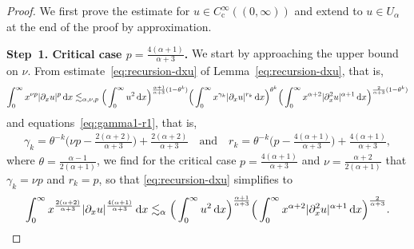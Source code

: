 \documentclass[reqno,12pt]{amsart}
\renewcommand{\d}{\ensuremath{\mathrm{d}}}
\renewcommand{\d}{\ensuremath{{\rm d}}}
\numberwithin{equation}{section}
\begin{document}
\begin{proof}
We first prove the estimate for $u \in C^\infty_\mathrm{c}((0,\infty))$ and extend to $u \in U_\alpha$ at the end of the proof by approximation.

%
\bigskip
%

\noindent\textbf{Step~1. Critical case $p = \frac{4(\alpha+1)}{\alpha+3}$.}
We start by approaching the upper bound on $\nu$.
%
From estimate~\eqref{eq:recursion-dxu} of Lemma~\ref{eq:recursion-dxu}, that is,
%
\begin{equation*}
\int_0^\infty x^{\nu p} |\partial_x u|^p \, \d x
 \lesssim_{\alpha,\nu,p}   \Big(  \int_0^\infty  u^2 \, \d x \Big)^{\frac{\alpha+1}{\alpha+3}(  1- \theta^k)}
\Big( \int_0^\infty x^{\gamma_k}
 |\partial_x u|^{r_k} \, \d x \Big)^{\theta^k}
 \Big( \int_0^\infty  x^{\alpha+2} |\partial_x^2 u|^{\alpha+1} \, \d x\Big)^{\frac{2}{\alpha+3}(1- \theta^k)}
\end{equation*}
and equations~\eqref{eq:gamma1-r1}, that is,
%
\begin{align*}
\gamma_k = \theta^{-k} \Big( \nu p - \frac{2(\alpha+2)}{\alpha+3} \Big) + \frac{2(\alpha+2)}{\alpha+3} \quad \text{and} \quad
r_k = \theta^{-k} \Big( p - \frac{4(\alpha+1)}{\alpha+3} \Big) + \frac{4(\alpha+1)}{\alpha+3},
\end{align*}
%
where $\theta = \frac{\alpha-1}{2(\alpha+1)}$, we find for the critical case $p=\frac{4(\alpha +1)}
%
{\alpha +3}$ and $\nu = \frac{\alpha +2}{2 (\alpha +1)}$ that $\gamma_k = \nu p$ and $r_k = p$, so 
%
that \eqref{eq:recursion-dxu} simplifies to
%
\begin{equation}\label{eq:weight xu lp'2}
\int_0^\infty x^{\frac{2(\alpha +2)}{\alpha+3}} |\partial_x u|^{\frac{4(\alpha +1)}{\alpha+3}} \, \d x \lesssim_{\alpha} \Big( \int_0^\infty  u^2 \, \d x \Big)^{\frac{\alpha +1}{\alpha +3}}  \Big( \int_0^\infty x^{\alpha+2}
|\partial_x^2 u|^{\alpha+1} \, \d x \Big)^{\frac{2}{\alpha+3}}.
\end{equation}
%

%
\bigskip
%


\end{proof}
\end{document}
